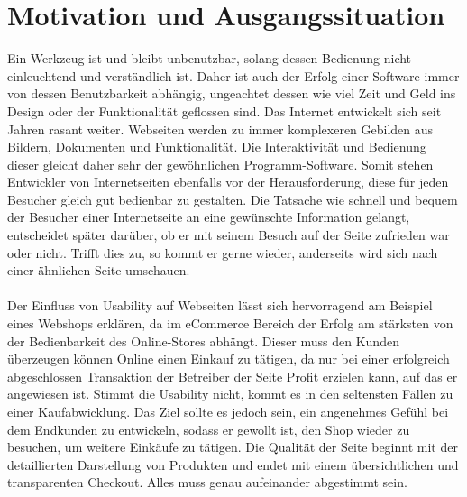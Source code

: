 %
%
%
%

\section{Motivation und Ausgangssituation}

Ein Werkzeug ist und bleibt unbenutzbar, solang dessen Bedienung nicht einleuchtend und verständlich ist. Daher ist auch der Erfolg einer Software immer von dessen Benutzbarkeit abhängig, ungeachtet dessen wie viel Zeit und Geld ins Design oder der Funktionalität geflossen sind. Das Internet entwickelt sich seit Jahren rasant weiter. Webseiten werden zu immer komplexeren Gebilden aus Bildern, Dokumenten und Funktionalität. Die Interaktivität und Bedienung dieser gleicht daher sehr der gewöhnlichen Programm-Software. Somit stehen Entwickler von Internetseiten ebenfalls vor der Herausforderung, diese für jeden Besucher gleich gut bedienbar zu gestalten. Die Tatsache wie schnell und bequem der Besucher einer Internetseite an eine gewünschte Information gelangt, entscheidet später darüber, ob er mit seinem Besuch auf der Seite zufrieden war oder nicht. Trifft dies zu, so kommt er gerne wieder, anderseits wird sich nach einer ähnlichen Seite umschauen.\\
\\
Der Einfluss von Usability auf Webseiten lässt sich hervorragend am Beispiel eines Webshops erklären, da im eCommerce Bereich der Erfolg am stärksten von der Bedienbarkeit des Online-Stores abhängt. Dieser muss den Kunden überzeugen können Online einen Einkauf zu tätigen, da nur bei einer erfolgreich abgeschlossen Transaktion der Betreiber der Seite Profit erzielen kann, auf das er angewiesen ist. Stimmt die Usability nicht, kommt es in den seltensten Fällen zu einer Kaufabwicklung. Das Ziel sollte es jedoch sein, ein angenehmes Gefühl bei dem Endkunden zu entwickeln, sodass er gewollt ist, den Shop wieder zu besuchen, um weitere Einkäufe zu tätigen. Die Qualität der Seite beginnt mit der detaillierten Darstellung von Produkten und endet mit einem übersichtlichen und transparenten Checkout. Alles muss genau aufeinander abgestimmt sein.\\
\\
\label{usability-auf-uniseiten}
